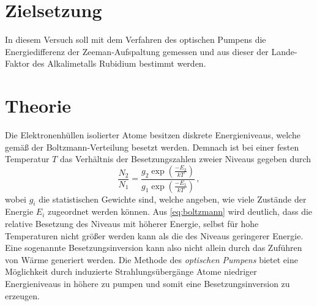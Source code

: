 



\maketitle

\section{Zielsetzung}
In diesem Versuch soll mit dem Verfahren des optischen Pumpens die Energiedifferenz der Zeeman-Aufspaltung gemessen und aus dieser der Lande-Faktor des Alkalimetalls Rubidium bestimmt werden.


\section{Theorie}
Die Elektronenhüllen isolierter Atome besitzen diskrete Energieniveaus, welche gemäß der Boltzmann-Verteilung besetzt werden.
Demnach ist bei einer festen Temperatur $T$ das Verhältnis der Besetzungszahlen zweier Niveaus gegeben durch
\begin{equation}\label{eq:boltzmann}
\frac{N_2}{N_1} = \frac{g_2 \exp\left(\frac{-E_2}{kT}\right)}{g_1 \exp\left(\frac{-E_1}{kT}\right)}\, ,
\end{equation}
wobei $g_i$ die statistischen Gewichte sind, welche angeben, wie viele Zustände der Energie $E_i$ zugeordnet werden können.
Aus \eqref{eq:boltzmann} wird deutlich, dass die relative Besetzung des Niveaus mit höherer Energie, selbst für hohe Temperaturen nicht größer werden kann als die des Niveaus geringerer Energie.
Eine sogenannte Besetzungsinversion kann also nicht allein durch das Zuführen von Wärme generiert werden.
Die Methode des \textit{optischen Pumpens} bietet eine Möglichkeit durch induzierte Strahlungsübergänge Atome niedriger Energieniveaus in höhere zu pumpen und somit eine Besetzungsinversion zu erzeugen.

